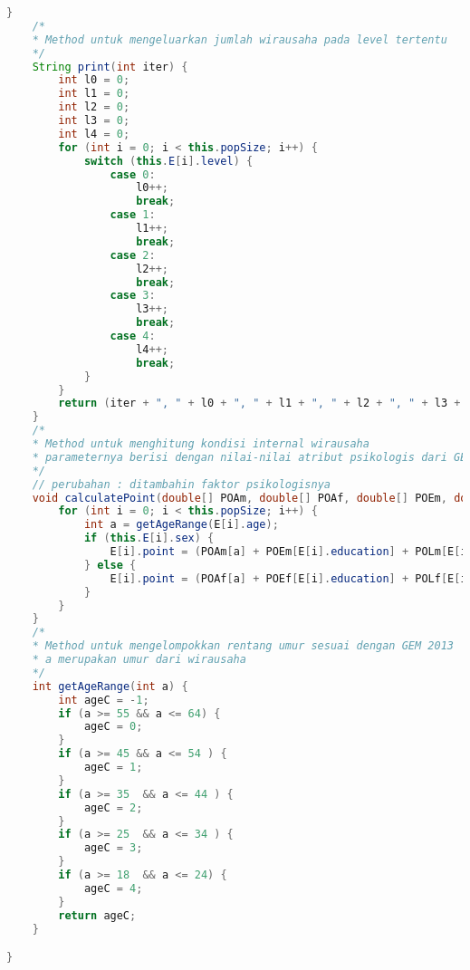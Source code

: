 \begin{lstlisting}[language=Java, caption=CA.java]
    }
    /*
    * Method untuk mengeluarkan jumlah wirausaha pada level tertentu
    */
    String print(int iter) {
        int l0 = 0;
        int l1 = 0;
        int l2 = 0;
        int l3 = 0;
        int l4 = 0;
        for (int i = 0; i < this.popSize; i++) {
            switch (this.E[i].level) {
                case 0:
                    l0++;
                    break;
                case 1:
                    l1++;
                    break;
                case 2:
                    l2++;
                    break;
                case 3:
                    l3++;
                    break;
                case 4:
                    l4++;
                    break;
            }
        }
        return (iter + ", " + l0 + ", " + l1 + ", " + l2 + ", " + l3 + ", " + l4);
    }
    /*
    * Method untuk menghitung kondisi internal wirausaha
    * parameternya berisi dengan nilai-nilai atribut psikologis dari GEM 2013
    */
    // perubahan : ditambahin faktor psikologisnya
    void calculatePoint(double[] POAm, double[] POAf, double[] POEm, double[] POEf, double[] POLm, double[] POLf, double[] POIm, double[] POIf, double[] PCAm, double[] PCAf, double[] PCEm, double[] PCEf, double[] PCLm, double[] PCLf, double[] PCIm, double[] PCIf, double[] RMAm, double[] RMAf, double[] RMIm, double[] RMIf, double[] FFAf, double[] FFAm, double[] FFEf, double[] FFEm, double[] FFLf, double[] FFLm, double[] MALf, double[] MALm, double[] MAIf, double[] MAIm, double[] HSSIf, double[] HSSIm, double[] HSSLf, double[] HSSLm, double[] HSSAf, double[] HSSAm, double[] HSSEf, double[] HSSEm) {
        for (int i = 0; i < this.popSize; i++) {
            int a = getAgeRange(E[i].age);
            if (this.E[i].sex) {
                E[i].point = (POAm[a] + POEm[E[i].education] + POLm[E[i].location] + POIm[E[i].income]) * 0.2 + (PCAm[a] + PCEm[E[i].education] + PCLm[E[i].location] + PCIm[E[i].income]) * 0.25 + (RMAm[a] + RMIm[E[i].income]) * 0.3 + (FFAm[a] + FFEm[E[i].education] + FFLm[E[i].location]) * 0.1 + (MALm[E[i].location] + MAIm[E[i].income]) * 0.05 + (HSSAm[a] + HSSIm[E[i].income] + HSSLm[E[i].location] + HSSEm[E[i].education]) * 0.1;
            } else {
                E[i].point = (POAf[a] + POEf[E[i].education] + POLf[E[i].location] + POIf[E[i].income]) * 0.2 + (PCAf[a] + PCEf[E[i].education] + PCLf[E[i].location] + PCIf[E[i].income]) * 0.25 + (RMAf[a] + RMIf[E[i].income]) * 0.3 + (FFAf[a] + FFEf[E[i].education] + FFLf[E[i].location]) * 0.1 + (MALf[E[i].location] + MAIf[E[i].income]) * 0.05 + (HSSAf[a] + HSSIf[E[i].income] + HSSLf[E[i].location] + HSSEf[E[i].education]) * 0.1;
            }
        }
    }
    /*
    * Method untuk mengelompokkan rentang umur sesuai dengan GEM 2013
    * a merupakan umur dari wirausaha
    */
    int getAgeRange(int a) {
        int ageC = -1;
        if (a >= 55 && a <= 64) {
            ageC = 0;
        }
        if (a >= 45 && a <= 54 ) {
            ageC = 1;
        }
        if (a >= 35  && a <= 44 ) {
            ageC = 2;
        }
        if (a >= 25  && a <= 34 ) {
            ageC = 3;
        }
        if (a >= 18  && a <= 24) {
            ageC = 4;
        }
        return ageC;
    }

}

\end{lstlisting}
